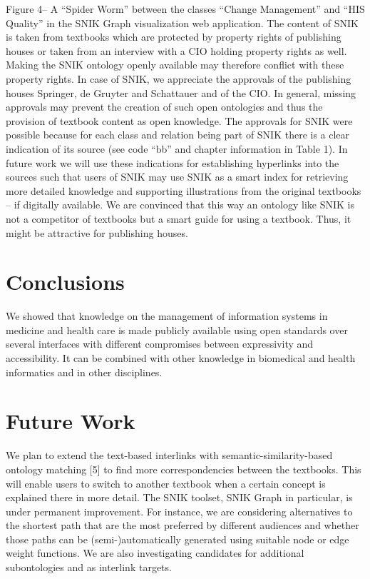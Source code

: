 \documentclass[sw]{iosart2x}
\begin{document}
Figure 4– A \enquote{Spider Worm} between the classes \enquote{Change Management} and \enquote{HIS Quality} in the SNIK Graph visualization web application.
The content of SNIK is taken from textbooks which are protected by property rights of publishing houses or taken from an interview with a CIO holding property rights as well.
Making the SNIK ontology openly available may therefore conflict with these property rights.
In case of SNIK, we appreciate the approvals of the publishing houses Springer, de Gruyter and Schattauer and of the CIO.
In general, missing approvals may prevent the creation of such open ontologies and thus the provision of textbook content as open knowledge.
The approvals for SNIK were possible because for each class and relation being part of SNIK there is a clear indication of its source (see code \enquote{bb} and chapter information in Table 1).
In future work we will use these indications for establishing hyperlinks into the sources such that users of SNIK may use SNIK as a smart index for retrieving more detailed knowledge and supporting illustrations from the original textbooks – if digitally available.
We are convinced that this way an ontology like SNIK is not a competitor of textbooks but a smart guide for using a textbook.
Thus, it might be attractive for publishing houses.


\section{Conclusions}
We showed that knowledge on the management of information systems in medicine and health care is made publicly available using open standards over several interfaces with different compromises between expressivity and accessibility.
It can be combined with other knowledge in biomedical and health informatics and in other disciplines.

\section{Future Work}
We plan to extend the text-based interlinks with semantic-similarity-based ontology matching [5] to find more correspondencies between the textbooks.
This will enable users to switch to another textbook when a certain concept is explained there in more detail.
The SNIK toolset, SNIK Graph in particular, is under permanent improvement.
For instance, we are considering alternatives to the shortest path that are the most preferred by different audiences and whether those paths can be (semi-)automatically generated using suitable node or edge weight functions.
We are also investigating candidates for additional subontologies and as interlink targets.
\end{document}
